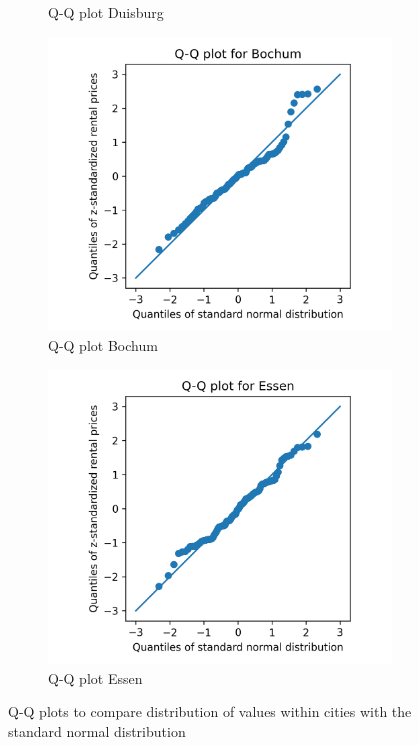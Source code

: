 \documentclass[12 pt]{scrartcl}
\begin{document}
\begin{figure}[h]
\begin{subfigure}[b]{0.40\textwidth}
    \caption{Q-Q plot Duisburg}
    \label{fig:qqplot-Duisburg}
  \end{subfigure}
  \begin{subfigure}[b]{0.40\textwidth}
    \centering
    \includegraphics[width=\textwidth]{./images/qqplot-Bochumc}
    \caption{Q-Q plot Bochum}
    \label{fig:qqplot-Bochum}
  \end{subfigure}
  \begin{subfigure}[b]{0.40\textwidth}
    \centering
    \includegraphics[width=\textwidth]{./images/qqplot-Essenc}
    \caption{Q-Q plot Essen}
    \label{fig:qqplot-Essen}
  \end{subfigure}

  \caption{Q-Q plots to compare distribution of values within cities with the standard normal distribution }
  \label{fig:qqplots}
\end{figure}
\end{document}
